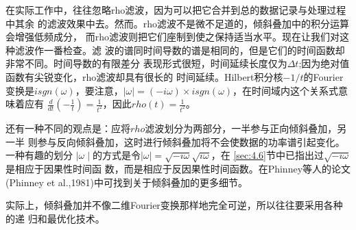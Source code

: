 在实际工作中，往往忽略rho滤波，因为可以把它合并到总的数据记录与处理过程中其余
的滤波效果中去。然而。rho滤波不是微不足道的，倾斜叠加中的积分运算会增强低频成分，
而rho滤波则把它们座制到使之保持适当水平。现在让我们对这种滤波作一番检查。滤
波的谱同时间导数的谱是相同的，但是它们的时间函数却非常不同。时间导数的有限差分
表现形式很短，时间延续长度仅为$\Delta t$;因为绝对值函数有尖锐变化，rho滤波却具有很长的
时间延续。Hilbert积分核$-1/t$的Fourier变换是$isgn(\omega)$，要注意，$\mid
\omega\mid = (-i\omega)\times i sgn(\omega)$，在时间域内这个关系式意味着应有
$\frac{d}{dt}(-\frac{1}{t})=\frac{1}{t^2}$，因此$rho(t)=\frac{1}{t^2}$。

还有一种不同的观点是：应将$rho$滤波划分为两部分，一半参与正向倾斜叠加，另一半
则参与反向倾斜叠加，这时进行倾斜叠加将不会使数据的功率谱引起变化。一种有趣的划分
$\mid \omega\mid$的方式是令$\mid\omega\mid=\sqrt{-i\omega}\sqrt{i\omega}$，在
\ref{sec:4.6}节中已指出过$\sqrt{-i\omega}$是相应于因果性时间函
数，而是相应于反因果性时间函数。在Phinney等人的论文(Phinney et
al.,1981)中可找到关于倾斜叠加的更多细节。

实际上，倾斜叠加并不像二维Fourier变换那样地完全可逆，所以往往要采用各种的递
归和最优化技术。








